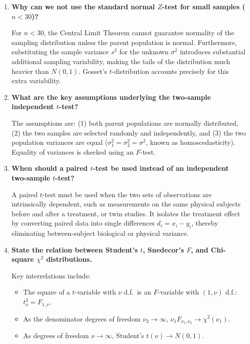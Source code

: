 \documentclass[12pt,a4paper]{article}
\newcommand{\Q}[1]{\textbf{#1}\par\noindent\ignorespaces}
\begin{document}
\begin{tcolorbox}[exambox, title={\textbf{Frequently Asked / Viva Questions}}]
\begin{enumerate}[topsep=0pt, label=\textbf{Q\arabic*.}, itemsep=5pt]
\item \Q{Why can we not use the standard normal $Z$-test for small samples ($n < 30$)?}
For $n < 30$, the Central Limit Theorem cannot guarantee normality of the sampling distribution unless the parent population is normal. Furthermore, substituting the sample variance $s^2$ for the unknown $\sigma^2$ introduces substantial additional sampling variability, making the tails of the distribution much heavier than $N(0, 1)$. Gosset's $t$-distribution accounts precisely for this extra variability.

\item \Q{What are the key assumptions underlying the two-sample independent $t$-test?}
The assumptions are: (1) both parent populations are normally distributed, (2) the two samples are selected randomly and independently, and (3) the two population variances are equal ($\sigma_1^2 = \sigma_2^2 = \sigma^2$, known as homoscedasticity). Equality of variances is checked using an $F$-test.

\item \Q{When should a paired $t$-test be used instead of an independent two-sample $t$-test?}
A paired $t$-test must be used when the two sets of observations are intrinsically dependent, such as measurements on the same physical subjects before and after a treatment, or twin studies. It isolates the treatment effect by converting paired data into single differences $d_i = x_i - y_i$, thereby eliminating between-subject biological or physical variance.

\item \Q{State the relation between Student's $t$, Snedecor's $F$, and Chi-square $\chi^2$ distributions.}
Key interrelations include:
\begin{itemize}[leftmargin=12pt, itemsep=1pt]
  \item The square of a $t$-variable with $\nu$ d.f.\ is an $F$-variable with $(1, \nu)$ d.f.: $t_\nu^2 = F_{1, \nu}$.
  \item As the denominator degrees of freedom $\nu_2 \to \infty$, $\nu_1 F_{\nu_1, \nu_2} \to \chi^2(\nu_1)$.
  \item As degrees of freedom $\nu \to \infty$, Student's $t(\nu) \to N(0, 1)$.
\end{itemize}


\end{enumerate}
\end{tcolorbox}
\end{document}
